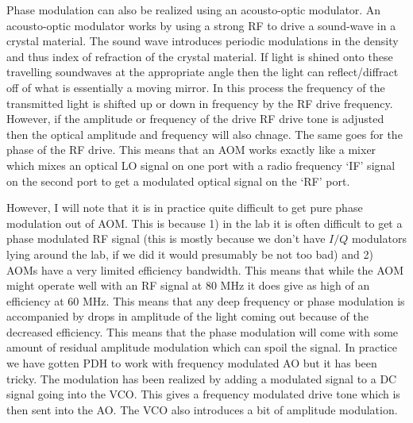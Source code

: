 \documentclass[12pt]{article}
\begin{document}
Phase modulation can also be realized using an acousto-optic modulator. An acousto-optic modulator works by using a strong RF to drive a sound-wave in a crystal material. The sound wave introduces periodic modulations in the density and thus index of refraction of the crystal material. If light is shined onto these travelling soundwaves at the appropriate angle then the light can reflect/diffract off of what is essentially a moving mirror. In this process the frequency of the transmitted light is shifted up or down in frequency by the RF drive frequency. However, if the amplitude or frequency of the drive RF drive tone is adjusted then the optical amplitude and frequency will also chnage. The same goes for the phase of the RF drive. This means that an AOM works exactly like a mixer which mixes an optical LO signal on one port with a radio frequency `IF' signal on the second port to get a modulated optical signal on the `RF' port.

However, I will note that it is in practice quite difficult to get pure phase modulation out of AOM. This is because 1) in the lab it is often difficult to get a phase modulated RF signal (this is mostly because we don't have $I/Q$ modulators lying around the lab, if we did it would presumably be not too bad) and 2) AOMs have a very limited efficiency bandwidth. This means that while the AOM might operate well with an RF signal at 80 MHz it does give as high of an efficiency at 60 MHz. This means that any deep frequency or phase modulation is accompanied by drops in amplitude of the light coming out because of the decreased efficiency. This means that the phase modulation will come with some amount of residual amplitude modulation which can spoil the signal. In practice we have gotten PDH to work with frequency modulated AO but it has been tricky. The modulation has been realized by adding a modulated signal to a DC signal going into the VCO. This gives a frequency modulated drive tone which is then sent into the AO. The VCO also introduces a bit of amplitude modulation.
\end{document}
